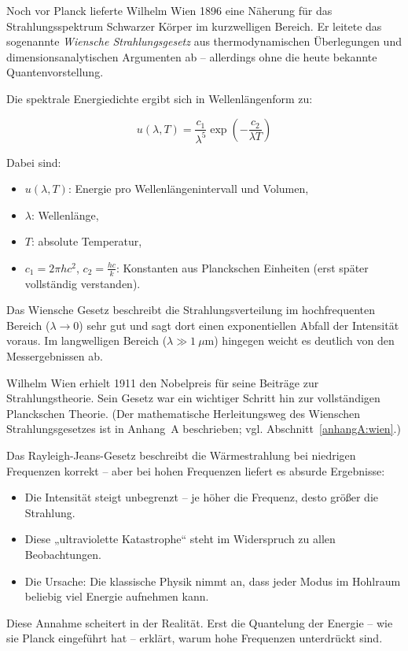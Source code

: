 Noch vor Planck lieferte Wilhelm Wien 1896 eine Näherung für das Strahlungsspektrum Schwarzer Körper im kurzwelligen Bereich. Er leitete das sogenannte \emph{Wiensche Strahlungsgesetz} aus thermodynamischen Überlegungen und dimensionsanalytischen Argumenten ab – allerdings ohne die heute bekannte Quantenvorstellung.

Die spektrale Energiedichte ergibt sich in Wellenlängenform zu:

\[
u(\lambda, T) = \frac{c_1}{\lambda^5} \exp\left(-\frac{c_2}{\lambda T}\right)
\]

Dabei sind:
\begin{itemize}
	\item \( u(\lambda, T) \): Energie pro Wellenlängenintervall und Volumen,
	\item \( \lambda \): Wellenlänge,
	\item \( T \): absolute Temperatur,
	\item \( c_1 = 2\pi h c^2 \), \( c_2 = \frac{hc}{k} \): Konstanten aus Planckschen Einheiten (erst später vollständig verstanden).
\end{itemize}

Das Wiensche Gesetz beschreibt die Strahlungsverteilung im hochfrequenten Bereich (\( \lambda \to 0 \)) sehr gut und sagt dort einen exponentiellen Abfall der Intensität voraus. Im langwelligen Bereich (\( \lambda \gg 1\ \mu\mathrm{m} \)) hingegen weicht es deutlich von den Messergebnissen ab.

Wilhelm Wien erhielt 1911 den Nobelpreis für seine Beiträge zur Strahlungstheorie. Sein Gesetz war ein wichtiger Schritt hin zur vollständigen Planckschen Theorie.
(Der mathematische Herleitungsweg des Wienschen Strahlungsgesetzes ist in Anhang~A beschrieben; vgl. Abschnitt~\ref{anhangA:wien}.)
\newpage
\noindent
\vspace{1em}
\begin{tcolorbox}[didaktikbox, title=Warum versagt die klassische Theorie?]
	\label{box:klassik-versagt}
	Das Rayleigh-Jeans-Gesetz beschreibt die Wärmestrahlung bei niedrigen Frequenzen korrekt – aber bei hohen Frequenzen liefert es absurde Ergebnisse:
	
	\begin{itemize}
		\item Die Intensität steigt unbegrenzt – je höher die Frequenz, desto größer die Strahlung.
		\item Diese „ultraviolette Katastrophe“ steht im Widerspruch zu allen Beobachtungen.
		\item Die Ursache: Die klassische Physik nimmt an, dass jeder Modus im Hohlraum beliebig viel Energie aufnehmen kann.
	\end{itemize}
	
	Diese Annahme scheitert in der Realität. Erst die Quantelung der Energie – wie sie Planck eingeführt hat – erklärt, warum hohe Frequenzen unterdrückt sind.
\end{tcolorbox}

